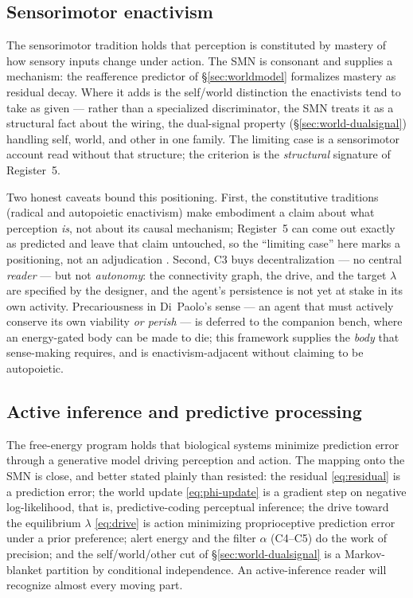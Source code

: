 \documentclass{article}
\begin{document}
\subsection{Sensorimotor enactivism}\label{sec:rel-enactive}

The sensorimotor tradition
\citep{OReganNoe2001Sensorimotor,noe_action_2004} holds that perception
is constituted by mastery of how sensory inputs change under action.  The
SMN is consonant and supplies a mechanism: the reafference predictor of
\S\ref{sec:worldmodel} formalizes mastery as residual decay.  Where it
adds is the self/world distinction the enactivists tend to take as given
--- rather than a specialized discriminator, the SMN treats it as a
structural fact about the wiring, the dual-signal property
(\S\ref{sec:world-dualsignal}) handling self, world, and other in one
family.  The limiting case is a sensorimotor account read without that
structure; the criterion is the \emph{structural} signature of Register~5.

Two honest caveats bound this positioning.  First, the constitutive traditions
(radical and autopoietic enactivism) make embodiment a claim about what
perception \emph{is}, not about its causal mechanism; Register~5 can come out
exactly as predicted and leave that claim untouched, so the ``limiting case''
here marks a positioning, not an adjudication
\citep{HuttoMyin2013RadicalizingEnactivism}.  Second, C3 buys decentralization
--- no central \emph{reader} --- but not \emph{autonomy}: the connectivity
graph, the drive, and the target $\lambda$ are specified by the designer, and
the agent's persistence is not yet at stake in its own activity.  Precariousness
in Di~Paolo's sense --- an agent that must actively conserve its own viability
\emph{or perish} \citep{DiPaolo2005Autopoiesis} --- is deferred to the companion
bench, where an energy-gated body can be made to die; this framework supplies
the \emph{body} that sense-making requires, and is enactivism-adjacent without
claiming to be autopoietic.

\subsection{Active inference and predictive processing}\label{sec:rel-ai}

The free-energy program \citep{Friston2010FEP,clark2008supersizing} holds
that biological systems minimize prediction error through a generative
model driving perception and action.  The mapping onto the SMN is close,
and better stated plainly than resisted: the residual \eqref{eq:residual}
is a prediction error; the world update \eqref{eq:phi-update} is a
gradient step on negative log-likelihood, that is, predictive-coding
perceptual inference; the drive toward the equilibrium $\lambda$
\eqref{eq:drive} is action minimizing proprioceptive prediction error
under a prior preference; alert energy and the filter $\alpha$ (C4--C5)
do the work of precision; and the self/world/other cut of
\S\ref{sec:world-dualsignal} is a Markov-blanket partition by conditional
independence.  An active-inference reader will recognize almost every
moving part.
\end{document}
